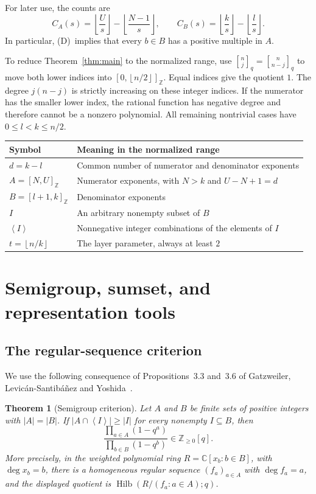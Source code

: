 \documentclass[11pt,a4paper]{article}
\numberwithin{equation}{section}
\newtheorem{theorem}{Theorem}[section]
\theoremstyle{remark}
\newcommand{\Z}{\mathbb Z}
\newcommand{\Nzero}{\mathbb Z_{\ge 0}}
\newcommand{\C}{\mathbb C}
\newcommand{\sg}[1]{\left\langle #1\right\rangle}
\newcommand{\floor}[1]{\left\lfloor #1\right\rfloor}
\newcommand{\qbinom}[2]{\genfrac{[}{]}{0pt}{}{#1}{#2}_{q}}
\DeclareMathOperator{\Hilb}{Hilb}
\newcommand{\Dcond}{\textup{(D)}}
\newcommand{\interval}[2]{[#1,#2]_{\Z}}
\begin{document}
For later use, the counts are
\begin{equation}\label{eq:counts}
  C_A(s)=\floor{\frac{U}{s}}-\floor{\frac{N-1}{s}},
  \qquad
  C_B(s)=\floor{\frac{k}{s}}-\floor{\frac{l}{s}}.
\end{equation}
In particular, \Dcond\ implies that every $b\in B$ has a positive
multiple in $A$.

To reduce Theorem~\ref{thm:main} to the normalized range, use
$\qbinom{n}{j}=\qbinom{n}{n-j}$ to move both lower indices into
$\interval{0}{\floor{n/2}}$. Equal indices give the quotient $1$.
The degree $j(n-j)$ is strictly increasing on these integer indices.
If the numerator has the smaller lower index, the rational function has
negative degree and therefore cannot be a nonzero polynomial. All
remaining nontrivial cases have $0\le l<k\le n/2$.

\begin{center}
\small
\begin{tabularx}{\textwidth}{@{}lX@{}}
\toprule
\textbf{Symbol} & \textbf{Meaning in the normalized range}\\
\midrule
$d=k-l$ & Common number of numerator and denominator exponents\\
$A=\interval{N}{U}$ & Numerator exponents, with $N>k$ and $U-N+1=d$\\
$B=\interval{l+1}{k}$ & Denominator exponents\\
$I$ & An arbitrary nonempty subset of $B$\\
$\sg{I}$ & Nonnegative integer combinations of the elements of $I$\\
$t=\floor{n/k}$ & The layer parameter, always at least $2$\\
\bottomrule
\end{tabularx}
\end{center}

\section{Semigroup, sumset, and representation tools}\label{sec:tools}

\subsection{The regular-sequence criterion}

We use the following consequence of Propositions~3.3 and~3.6
of Gatzweiler, Levic\'an-Santib\'a\~nez and Yoshida~\cite{GLY}.

\begin{theorem}[Semigroup criterion]\label{thm:GLY}
Let $A$ and $B$ be finite sets of positive integers with $|A|=|B|$.
If $|A\cap\sg{I}|\ge|I|$ for every nonempty $I\subseteq B$, then
\[
  \frac{\prod_{a\in A}(1-q^a)}{\prod_{b\in B}(1-q^b)}
  \in\Nzero[q].
\]
More precisely, in the weighted polynomial ring
$R=\C[x_b:b\in B]$, with $\deg x_b=b$, there is a homogeneous regular
sequence $(f_a)_{a\in A}$ with $\deg f_a=a$, and the displayed quotient
is $\Hilb(R/(f_a:a\in A);q)$.
\end{theorem}
\end{document}
